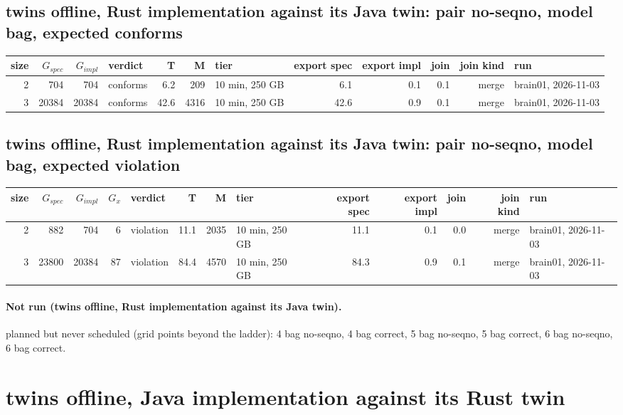 \documentclass[10pt]{article}
\begin{document}
\subsection*{twins offline, Rust implementation against its Java twin: pair \textsf{no-seqno}, model bag, expected conforms}
\begin{longtable}{@{}rrrlrrlrrrrl@{}}
\toprule
size & $G_{\mathit{spec}}$ & $G_{\mathit{impl}}$ & verdict & T & M & tier & export spec & export impl & join & join kind & run \\
\midrule
\endhead
\color{blue} 2 & 704 & 704 & conforms & 6.2 & 209 & 10 min, 250 GB & 6.1 & 0.1 & 0.1 & merge & brain01, 2026-11-03 \\
\color{blue} 3 & 20384 & 20384 & conforms & 42.6 & 4316 & 10 min, 250 GB & 42.6 & 0.9 & 0.1 & merge & brain01, 2026-11-03 \\
\bottomrule
\end{longtable}
\subsection*{twins offline, Rust implementation against its Java twin: pair \textsf{no-seqno}, model bag, expected violation}
\begin{longtable}{@{}rrrrlrrlrrrrl@{}}
\toprule
size & $G_{\mathit{spec}}$ & $G_{\mathit{impl}}$ & $G_x$ & verdict & T & M & tier & export spec & export impl & join & join kind & run \\
\midrule
\endhead
\color{blue} 2 & 882 & 704 & 6 & violation & 11.1 & 2035 & 10 min, 250 GB & 11.1 & 0.1 & 0.0 & merge & brain01, 2026-11-03 \\
\color{blue} 3 & 23800 & 20384 & 87 & violation & 84.4 & 4570 & 10 min, 250 GB & 84.3 & 0.9 & 0.1 & merge & brain01, 2026-11-03 \\
\bottomrule
\end{longtable}
\paragraph{Not run (twins offline, Rust implementation against its Java twin).}
planned but never scheduled (grid points beyond the ladder): 4 bag no-seqno, 4 bag correct, 5 bag no-seqno, 5 bag correct, 6 bag no-seqno, 6 bag correct.\par
\section*{twins offline, Java implementation against its Rust twin}
\end{document}
